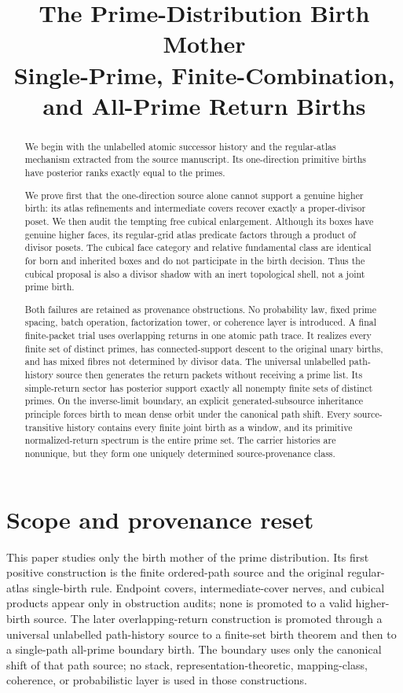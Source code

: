 \documentclass[11pt]{article}
\title{The Prime-Distribution Birth Mother\\
\large Single-Prime, Finite-Combination, and All-Prime Return Births}
\author{}
\date{}
\begin{document}
\maketitle

\begin{abstract}
We begin with the unlabelled atomic successor history and the regular-atlas
mechanism extracted from the source manuscript.  Its one-direction primitive
births have posterior ranks exactly equal to the primes.

We prove first that the one-direction source alone cannot support a genuine
higher birth: its atlas refinements and intermediate covers recover exactly a
proper-divisor poset.  We then audit the tempting free cubical enlargement.
Although its boxes have genuine higher faces, its regular-grid atlas predicate
factors through a product of divisor posets.  The cubical face category and
relative fundamental class are identical for born and inherited boxes and do
not participate in the birth decision.  Thus the cubical proposal is also a
divisor shadow with an inert topological shell, not a joint prime birth.

Both failures are retained as provenance obstructions.  No probability law,
fixed prime spacing, batch operation, factorization tower, or coherence layer
is introduced.  A final finite-packet trial uses overlapping returns in one
atomic path trace.  It realizes every finite set of distinct primes, has
connected-support descent to the original unary births, and has mixed fibres
not determined by divisor data.  The universal unlabelled path-history source
then generates the return packets without receiving a prime list.  Its
simple-return sector has posterior support exactly all nonempty finite sets of
distinct primes.  On the inverse-limit boundary, an explicit
generated-subsource inheritance principle forces birth to mean dense orbit
under the canonical path shift.  Every source-transitive history contains
every finite joint birth as a window, and its primitive normalized-return
spectrum is the entire prime set.  The carrier histories are nonunique, but
they form one uniquely determined source-provenance class.
\end{abstract}

\section{Scope and provenance reset}

This paper studies only the birth mother of the prime distribution.  Its first
positive construction is the finite ordered-path source and the original
regular-atlas single-birth rule.  Endpoint covers, intermediate-cover nerves,
and cubical products appear only in obstruction audits; none is promoted to a
valid higher-birth source.  The later overlapping-return construction is
promoted through a universal unlabelled path-history source to a finite-set
birth theorem and then to a single-path all-prime boundary birth.  The boundary
uses only the canonical shift of that path source; no stack,
representation-theoretic, mapping-class, coherence, or probabilistic layer is
used in those constructions.
\end{document}
